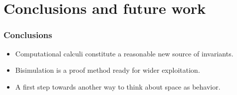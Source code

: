 \documentclass{beamer}
\begin{document}
\section{Conclusions and future work}

\begin{frame}
  \frametitle<presentation>{Conclusions}

  \begin{itemize}
  \item
    \alert{Computational calculi} constitute a reasonable new source of invariants.
  \item
    \alert{Bisimulation} is a proof method ready for wider exploitation.
  \item
   A first step towards another way to think about \alert{space as behavior}.
  \end{itemize}
  
\end{frame}
\end{document}
